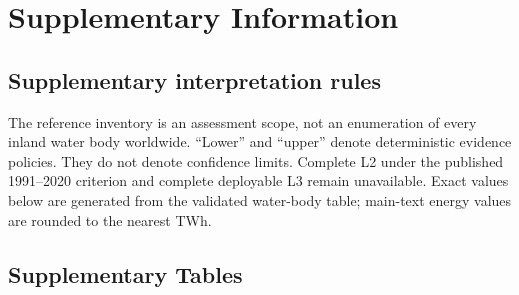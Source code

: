 
\section*{Supplementary Information}
\setcounter{table}{0}
\renewcommand{\thetable}{S\arabic{table}}
\setcounter{figure}{0}
\renewcommand{\thefigure}{S\arabic{figure}}

\subsection*{Supplementary interpretation rules}

The reference inventory is an assessment scope, not an enumeration of every inland water body worldwide. ``Lower'' and ``upper'' denote deterministic evidence policies. They do not denote confidence limits. Complete L2 under the published 1991--2020 criterion and complete deployable L3 remain unavailable. Exact values below are generated from the validated water-body table; main-text energy values are rounded to the nearest TWh.

\subsection*{Supplementary Tables}

